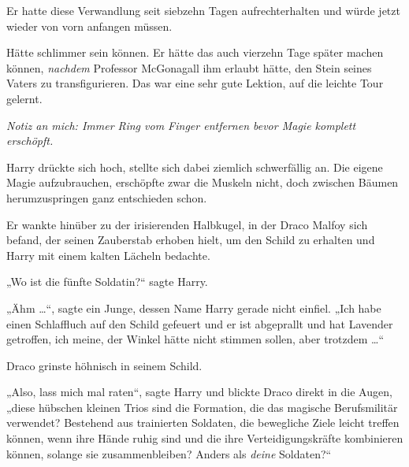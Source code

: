 Er hatte diese Verwandlung seit siebzehn Tagen aufrechterhalten und würde jetzt wieder von vorn anfangen müssen.

Hätte schlimmer sein können. Er hätte das auch vierzehn Tage später machen können, \emph{nachdem} Professor McGonagall ihm erlaubt hätte, den Stein seines Vaters zu transfigurieren. Das war eine sehr gute Lektion, auf die leichte Tour gelernt.

\emph{Notiz an mich: Immer Ring vom Finger entfernen bevor Magie komplett erschöpft.}

Harry drückte sich hoch, stellte sich dabei ziemlich schwerfällig an. Die eigene Magie aufzubrauchen, erschöpfte zwar die Muskeln nicht, doch zwischen Bäumen herumzuspringen ganz entschieden schon.

Er wankte hinüber zu der irisierenden Halbkugel, in der Draco Malfoy sich befand, der seinen Zauberstab erhoben hielt, um den Schild zu erhalten und Harry mit einem kalten Lächeln bedachte.

„Wo ist die fünfte Soldatin?“ sagte Harry.

„Ähm …“, sagte ein Junge, dessen Name Harry gerade nicht einfiel.
„Ich habe einen Schlaffluch auf den Schild gefeuert und er ist abgeprallt und hat Lavender getroffen, ich meine, der Winkel hätte nicht stimmen sollen, aber trotzdem …“

Draco grinste höhnisch in seinem Schild.

„Also, lass mich mal raten“, sagte Harry und blickte Draco direkt in die Augen, „diese hübschen kleinen Trios sind die Formation, die das magische Berufsmilitär verwendet? Bestehend aus trainierten Soldaten, die bewegliche Ziele leicht treffen können, wenn ihre Hände ruhig sind und die ihre Verteidigungskräfte kombinieren können, solange sie zusammenbleiben? Anders als \emph{deine} Soldaten?“

